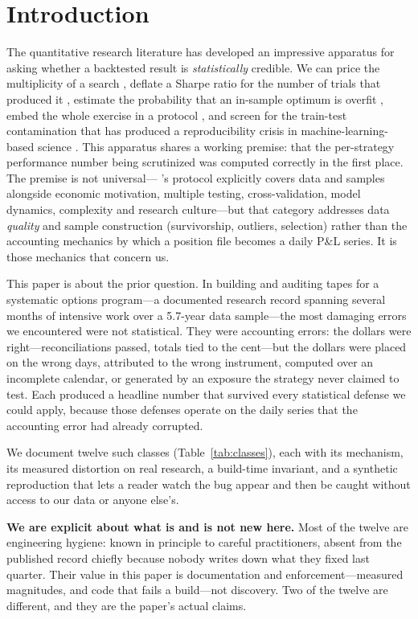 \documentclass[11pt]{article}
\begin{document}
\section{Introduction}
The quantitative research literature has developed an impressive apparatus for asking whether
a backtested result is \emph{statistically} credible. We can price the multiplicity of a
search \citep{hl, harvey2016}, deflate a Sharpe ratio for the number of trials that produced
it \citep{blp, blp2014b}, estimate the probability that an in-sample optimum is overfit
\citep{pbo}, embed the whole exercise in a protocol \citep{ahm}, and screen for the
train-test contamination that has produced a reproducibility crisis in machine-learning-based
science \citep{kn, reforms}. This apparatus shares a working premise: that the per-strategy performance number being
scrutinized was computed correctly in the first place. The premise is not universal---
\citet{ahm}'s protocol explicitly covers data and samples alongside economic motivation,
multiple testing, cross-validation, model dynamics, complexity and research culture---but that
category addresses data \emph{quality} and sample construction (survivorship, outliers,
selection) rather than the accounting mechanics by which a position file becomes a daily P\&L
series. It is those mechanics that concern us.

This paper is about the prior question. In building and auditing tapes for a systematic
options program---a documented research record spanning several months of intensive work over a
5.7-year data sample---the most damaging errors we encountered were not
statistical.
They were accounting errors: the dollars were right---reconciliations passed, totals tied to
the cent---but the dollars were placed on the wrong days, attributed to the wrong instrument,
computed over an incomplete calendar, or generated by an exposure the strategy never claimed to
test. Each produced a headline number that survived every statistical defense we could apply,
because those defenses operate on the daily series that the accounting error had already
corrupted.

We document twelve such classes (Table~\ref{tab:classes}), each with its mechanism, its
measured distortion on real research, a build-time invariant, and a synthetic reproduction that
lets a reader watch the bug appear and then be caught without access to our data or anyone
else's.

\textbf{We are explicit about what is and is not new here.} Most of the twelve are engineering
hygiene: known in principle to careful practitioners, absent from the published record chiefly
because nobody writes down what they fixed last quarter. Their value in this paper is
documentation and enforcement---measured magnitudes, and code that fails a build---not
discovery. Two of the twelve are different, and they are the paper's actual claims.
\end{document}

